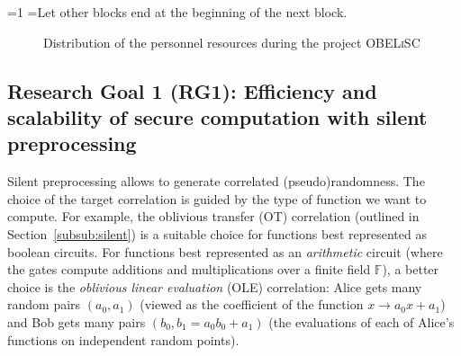 \documentclass[oneside, a4paper, onecolumn, 11pt]{article}
\newcommand{\OBELiSC}{\textsc{OBELiSC}\xspace}
\newcommand{\F}{\mathbb{F}}
\newcounter{alphasect}
\def\alphainsection{0}
\newenvironment{alphasection}{%
  \ifnum\alphainsection=1%
    \errhelp={Let other blocks end at the beginning of the next block.}
    \errmessage{Nested Alpha section not allowed}
  \fi%
  \setcounter{alphasect}{0}
  \def\alphainsection{1}
}{%
  \setcounter{alphasect}{0}
  \def\alphainsection{0}
}%
\begin{document}
\begin{alphasection}
\setlength{\abovecaptionskip}{-10pt}
\setlength{\belowcaptionskip}{-10pt}
\begin{figure}[hbt]
\begin{center}
\end{center}
\caption{Distribution of the personnel resources during the project \OBELiSC}
\label{fig:distribution}
\end{figure}

\subsection{Research Goal 1 (RG1): Efficiency and scalability of secure computation with silent preprocessing}
\label{wpone}

Silent preprocessing allows to generate correlated (pseudo)randomness. The choice of the target correlation is guided by the type of function we want to compute. For example, the oblivious transfer (OT) correlation (outlined in Section~\ref{subsub:silent}) is a suitable choice for functions best represented as boolean circuits. For functions best represented as an \emph{arithmetic} circuit (where the gates compute additions and multiplications over a finite field $\F$), a better choice is the \emph{oblivious linear evaluation} (OLE) correlation: Alice gets many random pairs $(a_0, a_1)$ (viewed as the coefficient of the function $x \rightarrow a_0 x + a_1$) and Bob gets many pairs $(b_0, b_1 = a_0b_0 + a_1)$ (the evaluations of each of Alice's functions on independent random points).


\end{alphasection}
\end{document}
